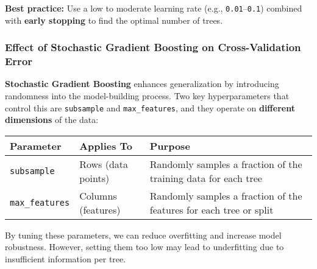 \documentclass[
  letterpaper,
  DIV=11,
  numbers=noendperiod]{scrreprt}
\begin{document}
\textbf{Best practice:} Use a low to moderate learning rate (e.g.,
\texttt{0.01}--\texttt{0.1}) combined with \textbf{early stopping} to
find the optimal number of trees.

\subsubsection{Effect of Stochastic Gradient Boosting on
Cross-Validation
Error}\label{effect-of-stochastic-gradient-boosting-on-cross-validation-error}

\textbf{Stochastic Gradient Boosting} enhances generalization by
introducing randomness into the model-building process. Two key
hyperparameters that control this are \texttt{subsample} and
\texttt{max\_features}, and they operate on \textbf{different
dimensions} of the data:

\begin{longtable}[]{@{}
  >{\raggedright\arraybackslash}p{}
  >{\raggedright\arraybackslash}p{}
  >{\raggedright\arraybackslash}p{}@{}}
\toprule\noalign{}
\begin{minipage}[b]{\linewidth}\raggedright
Parameter
\end{minipage} & \begin{minipage}[b]{\linewidth}\raggedright
Applies To
\end{minipage} & \begin{minipage}[b]{\linewidth}\raggedright
Purpose
\end{minipage} \\
\midrule\noalign{}
\endhead
\bottomrule\noalign{}
\endlastfoot
\texttt{subsample} & Rows (data points) & Randomly samples a fraction of
the training data for each tree \\
\texttt{max\_features} & Columns (features) & Randomly samples a
fraction of the features for each tree or split \\
\end{longtable}

By tuning these parameters, we can reduce overfitting and increase model
robustness. However, setting them too low may lead to underfitting due
to insufficient information per tree.
\end{document}
